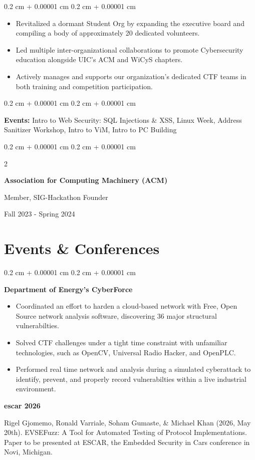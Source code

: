 \documentclass[10pt, letterpaper]{article}
\newenvironment{highlights}{
    \begin{itemize}[
        topsep=0.10 cm,
        parsep=0.10 cm,
        partopsep=0pt,
        itemsep=0pt,
        leftmargin=0.4 cm + 10pt
    ]
}{
    \end{itemize}
} %
\newenvironment{onecolentry}{
    \begin{adjustwidth}{
        0.2 cm + 0.00001 cm
    }{
        0.2 cm + 0.00001 cm
    }
}{
    \end{adjustwidth}
} %
\newenvironment{twocolentry}[2][]{
    \onecolentry
    \def\secondColumn{#2}
    \setcolumnwidth{\fill, 4.5 cm}
    \begin{paracol}{2}
}{
    \switchcolumn \raggedleft \secondColumn
    \end{paracol}
    \endonecolentry
} %
\begin{document}
\begin{onecolentry}
  \begin{itemize}
    \item Revitalized a dormant Student Org by expanding the executive board and compiling a body of approximately 20 dedicated volunteers.
    \item Led multiple inter-organizational collaborations to promote Cybersecurity education alongside UIC's ACM and WiCyS chapters.
    \item Actively manages and supports our organization's dedicated CTF teams in both training and competition participation.
  \end{itemize}
\end{onecolentry}

\begin{onecolentry}
  \textbf{Events:} Intro to Web Security: SQL Injections \& XSS, Linux Week, Address Sanitizer Workshop, Intro to ViM, Intro to PC Building
\end{onecolentry}

\begin{twocolentry}{

		Fall 2023 - Spring 2024}
	\textbf{Association for Computing Machinery (ACM)}

  Member, SIG-Hackathon Founder
\end{twocolentry}

\section{Events \& Conferences}

\begin{onecolentry}
	\textbf{Department of Energy's CyberForce}
	\begin{highlights}
    \item Coordinated an effort to harden a cloud-based network with Free, Open Source network analysis software, discovering 36 major structural vulnerabilties. 
    \item Solved CTF challenges under a tight time constraint with unfamiliar technologies, such as OpenCV, Universal Radio Hacker, and OpenPLC.
    \item Performed real time network and analysis during a simulated cyberattack to identify, prevent, and properly record vulnerabilties within a live industrial environment.
	\end{highlights}

  \textbf{escar 2026}

  Rigel Gjomemo, Ronald Varriale, Soham Gumaste, \& Michael Khan (2026, May 20th). EVSEFuzz: A Tool for Automated Testing of Protocol Implementations. Paper to be presented at ESCAR, the Embedded Security in Cars conference in Novi, Michigan. 
\end{onecolentry}
\end{document}
